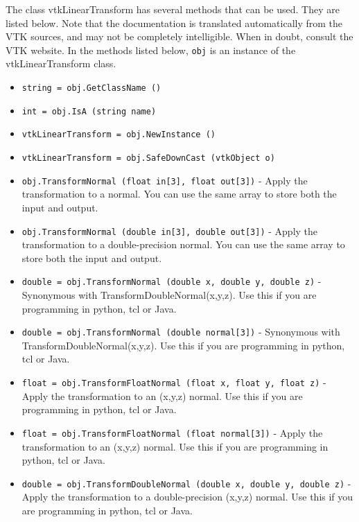 The class vtkLinearTransform has several methods that can be used.
  They are listed below.
Note that the documentation is translated automatically from the VTK sources,
and may not be completely intelligible.  When in doubt, consult the VTK website.
In the methods listed below, \verb|obj| is an instance of the vtkLinearTransform class.
\begin{itemize}
\item  \verb|string = obj.GetClassName ()|

\item  \verb|int = obj.IsA (string name)|

\item  \verb|vtkLinearTransform = obj.NewInstance ()|

\item  \verb|vtkLinearTransform = obj.SafeDownCast (vtkObject o)|

\item  \verb|obj.TransformNormal (float in[3], float out[3])| -  Apply the transformation to a normal.
 You can use the same array to store both the input and output.

\item  \verb|obj.TransformNormal (double in[3], double out[3])| -  Apply the transformation to a double-precision normal.
 You can use the same array to store both the input and output.

\item  \verb|double = obj.TransformNormal (double x, double y, double z)| -  Synonymous with TransformDoubleNormal(x,y,z).
 Use this if you are programming in python, tcl or Java.

\item  \verb|double = obj.TransformNormal (double normal[3])| -  Synonymous with TransformDoubleNormal(x,y,z).
 Use this if you are programming in python, tcl or Java.

\item  \verb|float = obj.TransformFloatNormal (float x, float y, float z)| -  Apply the transformation to an (x,y,z) normal.
 Use this if you are programming in python, tcl or Java.

\item  \verb|float = obj.TransformFloatNormal (float normal[3])| -  Apply the transformation to an (x,y,z) normal.
 Use this if you are programming in python, tcl or Java.

\item  \verb|double = obj.TransformDoubleNormal (double x, double y, double z)| -  Apply the transformation to a double-precision (x,y,z) normal.
 Use this if you are programming in python, tcl or Java.


\end{itemize}
